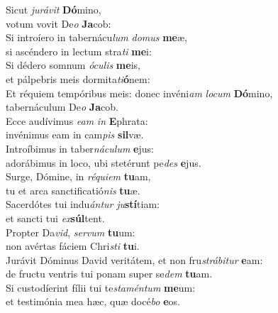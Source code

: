 \evenverse Sicut \textit{ju}\textit{rá}\textit{vit} \textbf{Dó}mino,~\*\\
\evenverse votum vovit De\textit{o} \textbf{Ja}cob:\\
\oddverse Si introíero in tabernácu\textit{lum} \textit{do}\textit{mus} \textbf{me}æ,~\*\\
\oddverse si ascéndero in lectum stra\textit{ti} \textbf{me}i:\\
\evenverse Si dédero somnum \textit{ó}\textit{cu}\textit{lis} \textbf{me}is,~\*\\
\evenverse et pálpebris meis dormita\textit{ti}\textbf{ó}nem:\\
\oddverse Et réquiem tempóribus meis: donec invéni\textit{am} \textit{lo}\textit{cum} \textbf{Dó}mino,~\*\\
\oddverse tabernáculum De\textit{o} \textbf{Ja}cob.\\
\evenverse Ecce audívimus \textit{e}\textit{am} \textit{in} \textbf{E}phrata:~\*\\
\evenverse invénimus eam in cam\textit{pis} \textbf{sil}væ.\\
\oddverse Introíbimus in taber\textit{ná}\textit{cu}\textit{lum} \textbf{e}jus:~\*\\
\oddverse adorábimus in loco, ubi stetérunt pe\textit{des} \textbf{e}jus.\\
\evenverse Surge, Dómine, in \textit{ré}\textit{qui}\textit{em} \textbf{tu}am,~\*\\
\evenverse tu et arca sanctificatió\textit{nis} \textbf{tu}æ.\\
\oddverse Sacerdótes tui indu\textit{án}\textit{tur} \textit{ju}\textbf{stí}tiam:~\*\\
\oddverse et sancti tui \textit{ex}\textbf{súl}tent.\\
\evenverse Propter Da\textit{vid}, \textit{ser}\textit{vum} \textbf{tu}um:~\*\\
\evenverse non avértas fáciem Chri\textit{sti} \textbf{tu}i.\\
\oddverse Jurávit Dóminus David veritátem, et non fru\textit{strá}\textit{bi}\textit{tur} \textbf{e}am:~\*\\
\oddverse de fructu ventris tui ponam super se\textit{dem} \textbf{tu}am.\\
\evenverse Si custodíerint fílii tui te\textit{sta}\textit{mén}\textit{tum} \textbf{me}um:~\*\\
\evenverse et testimónia mea hæc, quæ docé\textit{bo} \textbf{e}os.\\
